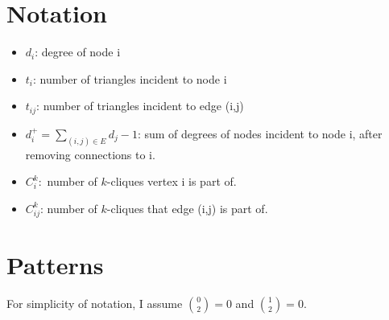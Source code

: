 \documentclass{siamltex}
\begin{document}
\section{ Notation}
\begin{itemize}
\item $d_i$: degree of node i
\item $t_i$: number of triangles incident to node i
\item $t_{ij}$: number of  triangles incident to  edge (i,j)
\item $d^+_i=\sum_{(i,j)\in E} d_j-1$: sum of degrees of nodes incident to node i, after removing connections to i.  
\item $C^k_i:$ number of $k$-cliques vertex i   is part of. 
\item  $C^k_{ij}$: number of $k$-cliques  that edge (i,j)   is part of. 
\end{itemize} 
\section{Patterns} 
For simplicity of notation, I assume ${0\choose 2}=0$  and ${1\choose 2}=0$.
\end{document}

